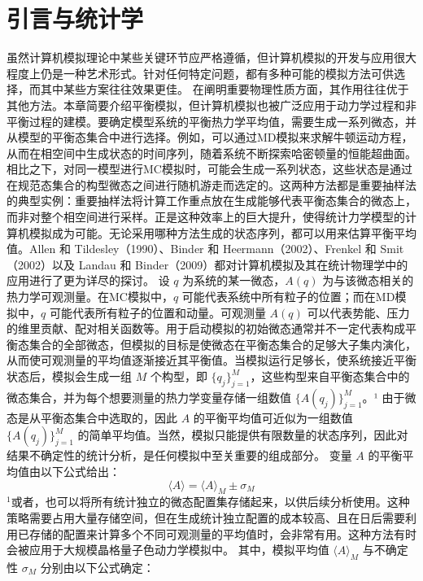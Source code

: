 \section{引言与统计学}\label{ux5f15ux8a00ux4e0eux7edfux8ba1ux5b66}
虽然计算机模拟理论中某些关键环节应严格遵循，但计算机模拟的开发与应用很大程度上仍是一种艺术形式。针对任何特定问题，都有多种可能的模拟方法可供选择，而其中某些方案往往效果更佳。
在阐明重要物理性质方面，其作用往往优于其他方法。本章简要介绍平衡模拟，但计算机模拟也被广泛应用于动力学过程和非平衡过程的建模。要确定模型系统的平衡热力学平均值，需要生成一系列微态，并从模型的平衡态集合中进行选择。例如，可以通过MD模拟来求解牛顿运动方程，从而在相空间中生成状态的时间序列，随着系统不断探索哈密顿量的恒能超曲面。相比之下，对同一模型进行MC模拟时，可能会生成一系列状态，这些状态是通过在规范态集合的构型微态之间进行随机游走而选定的。这两种方法都是重要抽样法的典型实例：重要抽样法将计算工作重点放在生成能够代表平衡态集合的微态上，而非对整个相空间进行采样。正是这种效率上的巨大提升，使得统计力学模型的计算机模拟成为可能。无论采用哪种方法生成的状态序列，都可以用来估算平衡平均值。Allen 和 Tildesley（1990）、Binder 和 Heermann（2002）、Frenkel 和 Smit（2002）以及 Landau 和 Binder（2009）都对计算机模拟及其在统计物理学中的应用进行了更为详尽的探讨。
设 \(q\) 为系统的某一微态，\(A(q)\) 为与该微态相关的热力学可观测量。在MC模拟中，\(q\) 可能代表系统中所有粒子的位置；而在MD模拟中，\(q\) 可能代表所有粒子的位置和动量。可观测量 \(A(q)\) 可以代表势能、压力的维里贡献、配对相关函数等。用于启动模拟的初始微态通常并不一定代表构成平衡态集合的全部微态，但模拟的目标是使微态在平衡态集合的足够大子集内演化，从而使可观测量的平均值逐渐接近其平衡值。当模拟运行足够长，使系统接近平衡状态后，模拟会生成一组 \(M\) 个构型，即 \(\{q_j\}_{j=1}^M\)，这些构型来自平衡态集合中的微态集合，并为每个想要测量的热力学变量存储一组数值 \(\{A(q_j)\}_{j=1}^M\)。¹ 由于微态是从平衡态集合中选取的，因此 \(A\) 的平衡平均值可近似为一组数值 \(\{A(q_j)\}_{j=1}^M\) 的简单平均值。当然，模拟只能提供有限数量的状态序列，因此对结果不确定性的统计分析，是任何模拟中至关重要的组成部分。
变量 \(A\) 的平衡平均值由以下公式给出：
\begin{equation}\tag{16.1.1}\label{eq:16.1.1}
\langle A \rangle = \langle A \rangle _ { M } \pm \sigma _ { M }
\end{equation}
\({}^{1}\)或者，也可以将所有统计独立的微态配置集存储起来，以供后续分析使用。这种策略需要占用大量存储空间，但在生成统计独立配置的成本较高、且在日后需要利用已存储的配置来计算多个不同可观测量的平均值时，会非常有用。这种方法有时会被应用于大规模晶格量子色动力学模拟中。
其中，模拟平均值 \(\langle A\rangle_{M}\) 与不确定性 \(\sigma_{M}\) 分别由以下公式确定：
